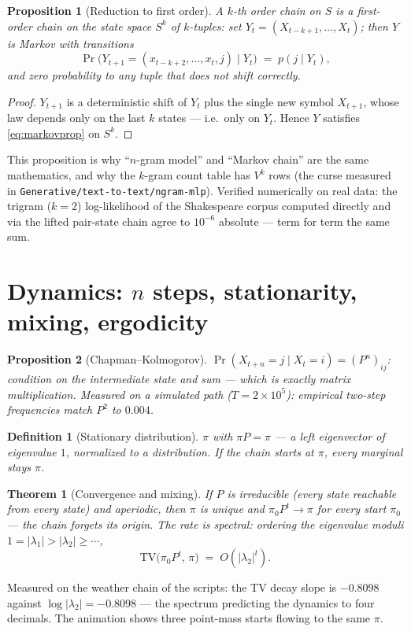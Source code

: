 \documentclass[11pt]{article}
\newtheorem{definition}{Definition}
\newtheorem{proposition}{Proposition}
\newtheorem{theorem}{Theorem}
\begin{document}
\begin{proposition}[Reduction to first order]
A $k$-th order chain on $S$ is a first-order chain on the state space
$S^k$ of $k$-tuples: set $Y_t = (X_{t-k+1}, \dots, X_t)$; then $Y$ is
Markov with transitions
\begin{equation}
  \Pr\bigl(Y_{t+1} = (x_{t-k+2}, \dots, x_t, j) \mid Y_t\bigr)
  \;=\; p(j \mid Y_t),
  \label{eq:lift}
\end{equation}
and zero probability to any tuple that does not shift correctly.
\end{proposition}

\begin{proof}
$Y_{t+1}$ is a deterministic shift of $Y_t$ plus the single new symbol
$X_{t+1}$, whose law depends only on the last $k$ states --- i.e.\
only on $Y_t$. Hence $Y$ satisfies \eqref{eq:markovprop} on $S^k$.
\end{proof}

This proposition is why ``$n$-gram model'' and ``Markov chain'' are the
same mathematics, and why the $k$-gram count table has $V^k$ rows (the
curse measured in \texttt{Generative/text-to-text/ngram-mlp}). Verified numerically on
real data: the trigram ($k=2$) log-likelihood of the Shakespeare
corpus computed directly and via the lifted pair-state chain agree to
$10^{-6}$ absolute --- term for term the same sum.

\section{Dynamics: $n$ steps, stationarity, mixing, ergodicity}

\begin{proposition}[Chapman--Kolmogorov]
$\Pr(X_{t+n} = j \mid X_t = i) = (P^n)_{ij}$: condition on the
intermediate state and sum --- which is exactly matrix multiplication.
Measured on a simulated path ($T = 2\times10^5$): empirical two-step
frequencies match $P^2$ to $0.004$.
\end{proposition}

\begin{definition}[Stationary distribution]
$\pi$ with $\pi P = \pi$ --- a left eigenvector of eigenvalue $1$,
normalized to a distribution. If the chain starts at $\pi$, every
marginal stays $\pi$.
\end{definition}

\begin{theorem}[Convergence and mixing]
If $P$ is irreducible (every state reachable from every state) and
aperiodic, then $\pi$ is unique and $\pi_0 P^t \to \pi$ for
\emph{every} start $\pi_0$ --- the chain forgets its origin. The rate
is spectral: ordering the eigenvalue moduli
$1 = |\lambda_1| > |\lambda_2| \ge \cdots$,
\begin{equation}
  \mathrm{TV}\bigl(\pi_0 P^t,\, \pi\bigr) \;=\; O(|\lambda_2|^t).
  \label{eq:mixing}
\end{equation}
\end{theorem}
Measured on the weather chain of the scripts: the TV decay slope is
$-0.8098$ against $\log|\lambda_2| = -0.8098$ --- the spectrum
predicting the dynamics to four decimals. The animation shows three
point-mass starts flowing to the same $\pi$.
\end{document}
